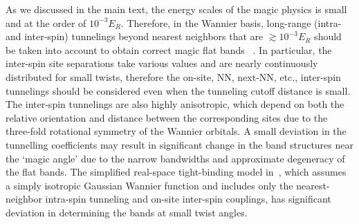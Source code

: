 \documentclass[twocolumn,english,prl,floatfix,citeautoscript,nofootinbib]{revtex4}
\begin{document}
\begin{widetext}
As we discussed in the main text, the energy scales of the magic physics is
small and at the order of $10^{-3}E_{R}$. Therefore, in the Wannier basis,
long-range (intra- and inter-spin) tunnelings beyond nearest neighbors that
are $\gtrsim 10^{-3}E_{R}$ should be taken into account to obtain correct
magic flat bands~\cite%
{PhysRevLett.99.256802S,PhysRevB.81.165105S,PNAS.108.12233S,PhysRevB.86.155449S}%
. In particular, the inter-spin site separations take various values and are
nearly continuously distributed for small twists, therefore the on-site, NN,
next-NN, etc., inter-spin tunnelings should be considered even when the
tunneling cutoff distance is small. The inter-spin tunnelings are also
highly anisotropic, which depend on both the relative orientation and
distance between the corresponding sites due to the three-fold rotational
symmetry of the Wannier orbitals. A small deviation in the tunnelling
coefficients may result in significant change in the band structures near
the `magic angle' due to the narrow bandwidths and approximate degeneracy of
the flat bands. The simplified real-space tight-binding model in~\cite%
{PhysRevA.100.053604S}, which assumes a simply isotropic Gaussian Wannier
function and includes only the nearest-neighbor intra-spin tunneling and
on-site inter-spin couplings, has significant deviation in determining the
bands at small twist angles.


\end{widetext}
\end{document}
